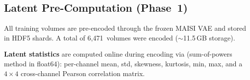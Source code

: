 \subsection{Latent Pre-Computation (Phase~1)}

All training volumes are pre-encoded through the frozen MAISI VAE and stored
in HDF5 shards.  A total of 6,471~volumes were encoded (${\sim}$11.5\,GB
storage).

\textbf{Latent statistics} are computed online during encoding via
 (sum-of-powers method in float64): per-channel
mean, std, skewness, kurtosis, min, max, and a $4{\times}4$ cross-channel
Pearson correlation matrix.
